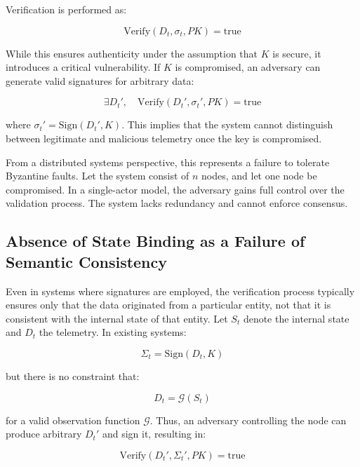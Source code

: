 Verification is performed as:

\begin{equation}
\text{Verify}(D_t, \sigma_t, PK) = \text{true}
\end{equation}

While this ensures authenticity under the assumption that $K$ is secure, it introduces a critical vulnerability. If $K$ is compromised, an adversary can generate valid signatures for arbitrary data:

\begin{equation}
\exists D_t', \quad \text{Verify}(D_t', \sigma_t', PK) = \text{true}
\end{equation}

where $\sigma_t' = \text{Sign}(D_t', K)$. This implies that the system cannot distinguish between legitimate and malicious telemetry once the key is compromised.

From a distributed systems perspective, this represents a failure to tolerate Byzantine faults. Let the system consist of $n$ nodes, and let one node be compromised. In a single-actor model, the adversary gains full control over the validation process. The system lacks redundancy and cannot enforce consensus.

\subsection{Absence of State Binding as a Failure of Semantic Consistency}

Even in systems where signatures are employed, the verification process typically ensures only that the data originated from a particular entity, not that it is consistent with the internal state of that entity. Let $S_t$ denote the internal state and $D_t$ the telemetry. In existing systems:

\begin{equation}
\Sigma_t = \text{Sign}(D_t, K)
\end{equation}

but there is no constraint that:

\begin{equation}
D_t = \mathcal{G}(S_t)
\end{equation}

for a valid observation function $\mathcal{G}$. Thus, an adversary controlling the node can produce arbitrary $D_t'$ and sign it, resulting in:

\begin{equation}
\text{Verify}(D_t', \Sigma_t', PK) = \text{true}
\end{equation}

